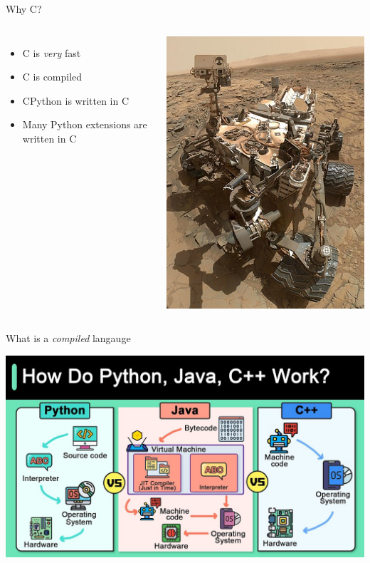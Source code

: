 \documentclass[12pt, aspectration=169]{beamer}
\begin{document}
    \begin{frame}{Why C?}
        \begin{columns}
            \begin{itemize}
                \item C is \textit{very} fast
                \item C is compiled
                \item CPython is written in C
                \item Many Python extensions are written in C
            \end{itemize}
            \includegraphics[scale=0.35]{static/images/390px-Curiosity_Self-Portrait_at_'Big_Sky'_Drilling_Site}
        \end{columns}
    \end{frame}

    \begin{frame}{What is a \textit{compiled} langauge}
        \begin{center}
            \includegraphics[scale=0.25]{static/images/how_python_works}
        \end{center}
    \end{frame}
\end{document}
